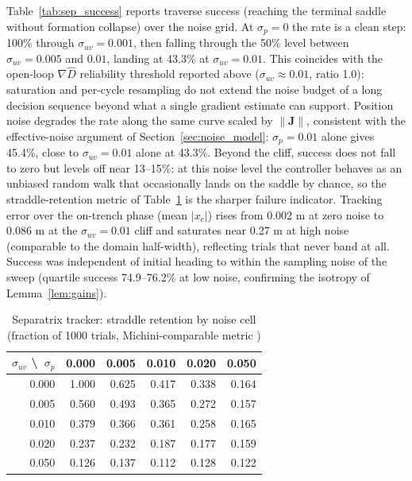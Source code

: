 \documentclass[lettersize,journal]{IEEEtran}
\begin{document}
Table~\ref{tab:sep_success} reports traverse success (reaching the
terminal saddle without formation collapse) over the noise grid. At
$\sigma_p = 0$ the rate is a clean step: 100\% through
$\sigma_{uv} = 0.001$, then falling through the 50\% level between
$\sigma_{uv} = 0.005$ and $0.01$, landing at 43.3\% at
$\sigma_{uv} = 0.01$. This coincides with the open-loop
$\nabla\hat{D}$ reliability threshold reported above
($\sigma_{uv} \approx 0.01$, ratio 1.0): saturation and per-cycle
resampling do not extend the noise budget
of a long decision sequence beyond what a single gradient estimate can
support. Position noise degrades the rate along the same curve scaled
by $\|\mathbf{J}\|$, consistent with the effective-noise argument of
Section~\ref{sec:noise_model}: $\sigma_p = 0.01$ alone gives 45.4\%,
close to $\sigma_{uv} = 0.01$ alone at 43.3\%. Beyond the cliff, success
does not fall to zero but levels off near 13--15\%: at this noise level
the controller behaves as an unbiased random walk that occasionally
lands on the saddle by chance, so the straddle-retention metric of
Table~\ref{tab:sep_straddle} is the sharper failure indicator. Tracking
error over the on-trench phase (mean $|x_c|$) rises from 0.002 m at zero
noise to 0.086 m at the $\sigma_{uv} = 0.01$ cliff and saturates near
0.27 m at high noise (comparable to the domain half-width), reflecting
trials that never band at all. Success was independent of initial
heading to within the sampling noise of the sweep (quartile success
74.9--76.2\% at low noise, confirming the isotropy of
Lemma~\ref{lem:gains}).

\begin{table}[!t]
\centering
\caption{Separatrix tracker: straddle retention by noise cell (fraction
of 1000 trials, Michini-comparable metric \cite{9})}
\label{tab:sep_straddle}
\footnotesize
\setlength{\tabcolsep}{4pt}
\begin{tabular}{r|rrrrr}
\hline
$\sigma_{uv}$ \textbackslash\ $\sigma_p$ & 0.000 & 0.005 & 0.010 & 0.020 & 0.050 \\
\hline
0.000 & 1.000 & 0.625 & 0.417 & 0.338 & 0.164 \\
0.005 & 0.560 & 0.493 & 0.365 & 0.272 & 0.157 \\
0.010 & 0.379 & 0.366 & 0.361 & 0.258 & 0.165 \\
0.020 & 0.237 & 0.232 & 0.187 & 0.177 & 0.159 \\
0.050 & 0.126 & 0.137 & 0.112 & 0.128 & 0.122 \\
\hline
\end{tabular}
\end{table}
\end{document}
